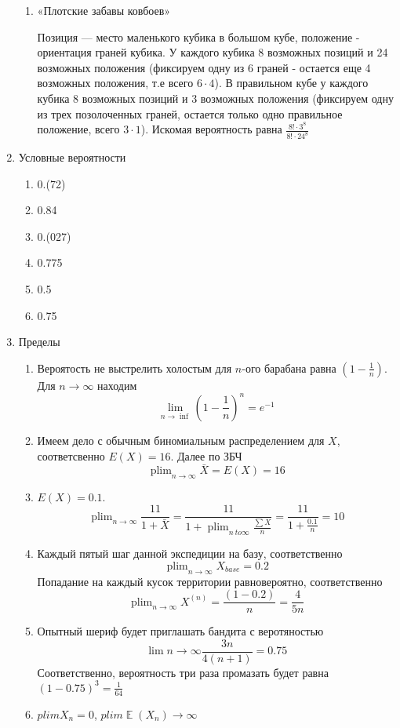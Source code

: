 \documentclass[11pt, a4paper]{article}
\DeclareMathOperator*\plim{plim}
\DeclareMathOperator{\E}{\mathbb{E}}
\theoremstyle{definition}
\begin{document}
\begin{enumerate}
\begin{enumerate}
    
    \item «Плотские забавы ковбоев»
    
    Позиция — место маленького кубика в большом кубе, положение - ориентация граней кубика. У каждого кубика 8 возможных позиций и 24 возможных положения (фиксируем одну из 6 граней - остается еще 4 возможных положения, т.е всего $6\cdot4$). В правильном кубе у каждого кубика 8 возможных позиций и 3 возможных положения (фиксируем одну из трех позолоченных граней, остается только одно правильное положение, всего $3\cdot1$). Искомая вероятность равна $\frac{8!\cdot3^8}{8!\cdot24^8}$ 
    \end{enumerate}    
    
    \item Условные вероятности 

\begin{enumerate}
    \item 0.(72)
    \item 0.84
    \item 0.(027)
    \item 0.775
    \item 0.5
    \item 0.75
\end{enumerate}    
    
    \item Пределы

\begin{enumerate}
    \item Вероятость не выстрелить холостым для $n$-ого барабана равна $(1-\frac{1}{n})$. Для $n \to \infty$ находим \[\lim_{n \to \inf}{(1-\frac{1}{n})^{n}} = e^{-1}\]
    \item Имеем дело с обычным биномиальным распределением для $X$, соответсвенно $E(X) = 16$. 
    \newline Далее по ЗБЧ \[\plim_{n \to \infty}{\bar X} = E(X) = 16\]
    \item $E(X) = 0.1.$ \[\plim_{n \to \infty}{\frac{11}{1+\bar X}} = \frac{11}{1+\plim_{n \ to \infty}{\frac{\sum X}{n}} }= \frac{11}{1+\frac{0.1}{n}} = 10\]
    \item Каждый пятый шаг данной экспедиции на базу, соответственно \[\plim_{n \to \infty}{X_{base}}=0.2\] \newline Попадание на каждый кусок территории равновероятно, соответственно \[\plim_{n \to \infty}{X^{(n)}} = \frac{(1-0.2)}{n} = \frac{4}{5n}\]
    \item Опытный шериф будет приглашать бандита с веротяностью \[\lim{n \to \infty}{\frac{3n}{4(n+1)}} = 0.75\] \newline Соответственно, вероятность три раза промазать будет равна $(1-0.75)^3 = \frac{1}{64}$
    \item $plim X_n = 0$, $plim \E(X_n) \to \infty$
\end{enumerate}    
    

\end{enumerate}
\end{document}
